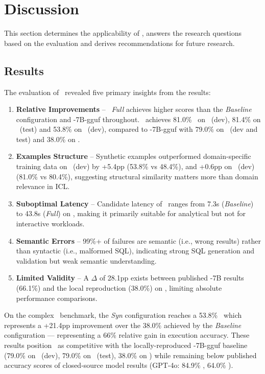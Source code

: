 \section{Discussion}

This section determines the applicability of \Natural, answers the
research questions based on the evaluation and derives recommendations for
future research.

\subsection{Results}

The evaluation of \Natural~revealed five primary insights from the results:

\begin{enumerate}
    \item \textbf{Relative Improvements} – \Natural~\textit{Full} achieves
        higher scores than the \textit{Baseline} configuration and
        \OmniSQL-7B-gguf throughout. \Natural~achieves 81.0\% \EA~on
        \Spider~(dev), 81.4\% on \Spider~(test) and 53.8\% on \Bird~(dev),
        compared to \OmniSQL-7B-gguf with 79.0\% on \Spider~(dev and test) and
        38.0\% on \Bird.
    \item \textbf{Examples Structure} – Synthetic examples outperformed
        domain-specific training data on \Bird~(dev) by +5.4pp (53.8\% vs
        48.4\%), and +0.6pp on \Spider~(dev) (81.0\% vs 80.4\%), suggesting
        structural similarity matters more than domain relevance in ICL.
    \item \textbf{Suboptimal Latency} – Candidate latency of \Natural~ranges
        from 7.3s (\textit{Baseline}) to 43.8s (\textit{Full}) on \Bird, making
        it primarily suitable for analytical but not for interactive workloads.
    \item \textbf{Semantic Errors} – 99\%+ of failures are semantic (i.e.,
        wrong results) rather than syntactic (i.e., malformed SQL), indicating
        strong SQL generation and validation but weak semantic understanding.
    \item \textbf{Limited Validity} – A $\Delta$ of 28.1pp exists between
        published \OmniSQL-7B results (66.1\%) and the local reproduction
        (38.0\%) on \Bird, limiting absolute performance comparisons.
\end{enumerate}

On the complex \Bird~benchmark, the \textit{Syn} configuration reaches a 53.8\%
\EA~which represents a +21.4pp improvement over the 38.0\% achieved by the
\textit{Baseline} configuration — representing a 66\% relative gain in
execution accuracy. These results position \Natural~as competitive with the
locally-reproduced \OmniSQL-7B-gguf baseline (79.0\% on \Spider~(dev), 79.0\%
on \Spider~(test), 38.0\% on \Bird) while remaining below published accuracy
scores of closed-source model results (GPT-4o: 84.9\% \Spider, 64.0\% \Bird).

